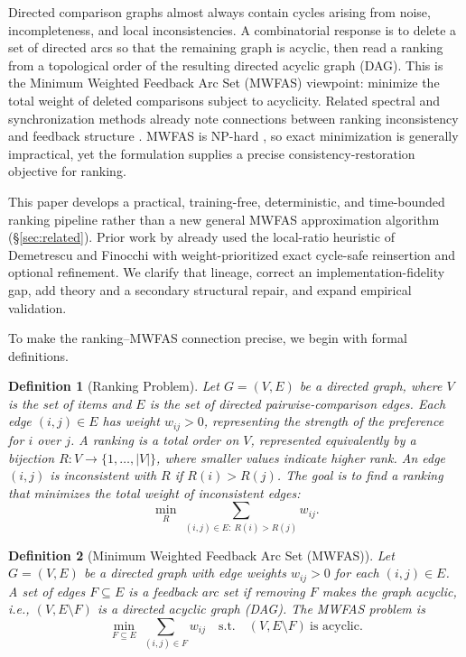 \documentclass{article}
\newtheorem{definition}{Definition}
\begin{document}
Directed comparison graphs almost always contain cycles arising from noise, incompleteness, and local inconsistencies. A combinatorial response is to delete a set of directed arcs so that the remaining graph is acyclic, then read a ranking from a topological order of the resulting directed acyclic graph (DAG). This is the Minimum Weighted Feedback Arc Set (MWFAS) viewpoint: minimize the total weight of deleted comparisons subject to acyclicity. Related spectral and synchronization methods already note connections between ranking inconsistency and feedback structure \citet{SerialRank,SyncRank}. MWFAS is NP-hard \citet{K72}, so exact minimization is generally impractical, yet the formulation supplies a precise consistency-restoration objective for ranking.

This paper develops a practical, training-free, deterministic, and time-bounded ranking pipeline rather than a new general MWFAS approximation algorithm (\S\ref{sec:related}). Prior work by \citet{VK25} already used the local-ratio heuristic of Demetrescu and Finocchi \citet{CI03} with weight-prioritized exact cycle-safe reinsertion and optional refinement. We clarify that lineage, correct an implementation-fidelity gap, add theory and a secondary structural repair, and expand empirical validation.

To make the ranking--MWFAS connection precise, we begin with formal definitions.

\begin{definition}[Ranking Problem]
Let $G=(V,E)$ be a directed graph, where $V$ is the set of items and $E$ is the set of directed pairwise-comparison edges.
Each edge $(i,j)\in E$ has weight $w_{ij}>0$, representing the strength of the preference for $i$ over $j$.
A \emph{ranking} is a total order on $V$, represented equivalently by a bijection $R:V\rightarrow\{1,\dots,|V|\}$, where smaller values indicate higher rank.
An edge $(i,j)$ is \emph{inconsistent} with $R$ if $R(i)>R(j)$.
The goal is to find a ranking that minimizes the total weight of inconsistent edges:
\begin{equation}
\label{eq:ranking_obj}
\min_{R}\ \sum_{(i,j)\in E:\ R(i)>R(j)} w_{ij}.
\end{equation}
\end{definition}

\begin{definition}[Minimum Weighted Feedback Arc Set (MWFAS)]
Let $G=(V,E)$ be a directed graph with edge weights $w_{ij}>0$ for each $(i,j)\in E$.
A set of edges $F\subseteq E$ is a \emph{feedback arc set} if removing $F$ makes the graph acyclic, i.e., $(V,E\setminus F)$ is a directed acyclic graph (DAG).
The MWFAS problem is
\begin{equation}
\label{eq:mwfas}
\min_{F\subseteq E}\ \sum_{(i,j)\in F} w_{ij}
\quad \text{s.t.} \quad (V,E\setminus F)\ \text{is acyclic.}
\end{equation}
\end{definition}
\end{document}
